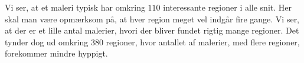 {Vi ser, at et maleri typisk har omkring $110$ interessante regioner i
alle snit. Her skal man være opmærksom på, at hver region meget vel
indgår fire gange. Vi ser, at der er et lille antal malerier, hvori der
bliver fundet rigtig mange regioner. Det tynder dog ud omkring
$380$ regioner, hvor antallet af malerier, med flere regioner,
forekommer mindre hyppigt.

}
